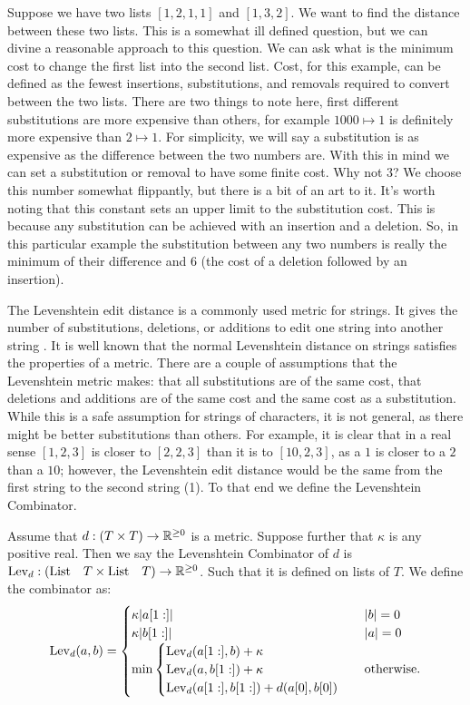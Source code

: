 Suppose we have two lists $[1, 2, 1, 1]$ and $[1, 3, 2]$.
We want to find the distance between these two lists. 
This is a somewhat ill defined question,
but we can divine a reasonable approach to this question.
We can ask what is the minimum cost to change the first list into the second list.
Cost, for this example, can be defined as the fewest insertions, substitutions, and removals required to convert between the two lists.
There are two things to note here, first different substitutions are more expensive than others,
for example $1000 \mapsto 1$ is definitely more expensive than $2 \mapsto 1$.
For simplicity, we will say a substitution is as expensive as the difference between the two numbers are.
With this in mind we can set a substitution or removal to have some finite cost. Why not $3$?
We choose this number somewhat flippantly, but there is a bit of an art to it.
It's worth noting that this constant sets an upper limit to the substitution cost.
This is because any substitution can be achieved with an insertion and a deletion.
So, in this particular example the substitution between any two numbers is really the minimum of their difference and $6$ (the cost of a deletion followed by an insertion).

The Levenshtein edit distance is a commonly used metric for strings.
It gives the number of substitutions, deletions, or additions to edit one string into another string \cite{wiki:levenshtein}.
It is well known that the normal Levenshtein distance on strings satisfies the properties of a metric.
There are a couple of assumptions that the Levenshtein metric makes:
that all substitutions are of the same cost,
that deletions and additions are of the same cost and the same cost as a substitution.
While this is a safe assumption for strings of characters,
it is not general, as there might be better substitutions than others.
For example, 
it is clear that in a real sense $[1, 2, 3]$ is closer to $[2, 2, 3]$ than it is to $[10, 2, 3]$,
as a $1$ is closer to a $2$ than a $10$;
however, the Levenshtein edit distance would be the same from the first string to the second string (1).
To that end we define the Levenshtein Combinator.

\begin{definition}
Assume that $d : (T \times T) \to \mathbb{R}^{\ge 0}$ is a metric.
Suppose further that $\kappa$ is any positive real.
Then we say the Levenshtein Combinator of $d$ is  $\text{Lev}_{d} : (\text{List}\quad T \times \text{List}\quad T) \to \mathbb{R}^{\ge 0}$.
Such that it is defined on lists of $T$.
We define the combinator as: 
$$ \lev{d}(a, b) = \begin{cases} 
    \kappa | \tail{a} | & |b| = 0 \\
    \kappa | \tail{b} | & |a| = 0 \\ 
    \text{min} \begin{cases}
        \lev{d}(\tail{a}, b) + \kappa \\
        \lev{d}(a, \tail{b}) + \kappa \\
        \lev{d}(\tail{a}, \tail{b}) + d(\head{a}, \head{b})  %
    \end{cases} & \otw
\end{cases}$$
\end{definition}

